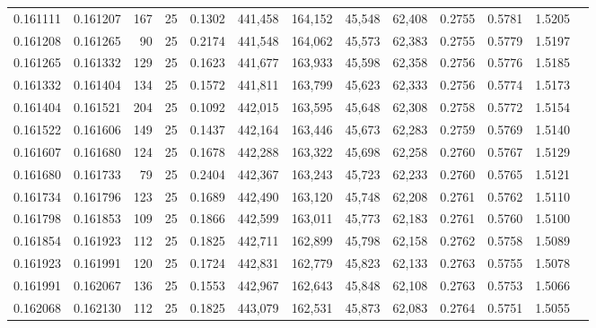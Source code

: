 \begin{tabular}{rrrrrrrrrrrrr}
0.161111 & 0.161207 &   167 &  25 &                                     0.1302 & 441,458 & 164,152 &  45,548 &  62,408 & 0.2755 & 0.5781 & 1.5205 \\
0.161208 & 0.161265 &    90 &  25 &                                     0.2174 & 441,548 & 164,062 &  45,573 &  62,383 & 0.2755 & 0.5779 & 1.5197 \\
0.161265 & 0.161332 &   129 &  25 &                                     0.1623 & 441,677 & 163,933 &  45,598 &  62,358 & 0.2756 & 0.5776 & 1.5185 \\
0.161332 & 0.161404 &   134 &  25 &                                     0.1572 & 441,811 & 163,799 &  45,623 &  62,333 & 0.2756 & 0.5774 & 1.5173 \\
0.161404 & 0.161521 &   204 &  25 &                                     0.1092 & 442,015 & 163,595 &  45,648 &  62,308 & 0.2758 & 0.5772 & 1.5154 \\
0.161522 & 0.161606 &   149 &  25 &                                     0.1437 & 442,164 & 163,446 &  45,673 &  62,283 & 0.2759 & 0.5769 & 1.5140 \\
0.161607 & 0.161680 &   124 &  25 &                                     0.1678 & 442,288 & 163,322 &  45,698 &  62,258 & 0.2760 & 0.5767 & 1.5129 \\
0.161680 & 0.161733 &    79 &  25 &                                     0.2404 & 442,367 & 163,243 &  45,723 &  62,233 & 0.2760 & 0.5765 & 1.5121 \\
0.161734 & 0.161796 &   123 &  25 &                                     0.1689 & 442,490 & 163,120 &  45,748 &  62,208 & 0.2761 & 0.5762 & 1.5110 \\
0.161798 & 0.161853 &   109 &  25 &                                     0.1866 & 442,599 & 163,011 &  45,773 &  62,183 & 0.2761 & 0.5760 & 1.5100 \\
0.161854 & 0.161923 &   112 &  25 &                                     0.1825 & 442,711 & 162,899 &  45,798 &  62,158 & 0.2762 & 0.5758 & 1.5089 \\
0.161923 & 0.161991 &   120 &  25 &                                     0.1724 & 442,831 & 162,779 &  45,823 &  62,133 & 0.2763 & 0.5755 & 1.5078 \\
0.161991 & 0.162067 &   136 &  25 &                                     0.1553 & 442,967 & 162,643 &  45,848 &  62,108 & 0.2763 & 0.5753 & 1.5066 \\
0.162068 & 0.162130 &   112 &  25 &                                     0.1825 & 443,079 & 162,531 &  45,873 &  62,083 & 0.2764 & 0.5751 & 1.5055 \\

\end{tabular}
